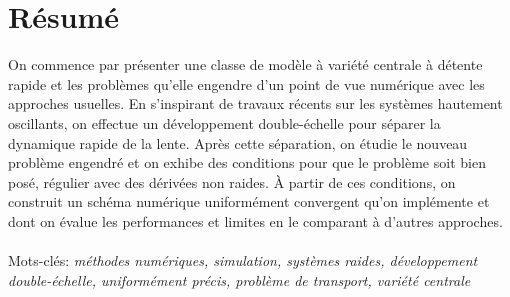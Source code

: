 \documentclass{templatePFE}
\begin{document}
\soustitre{} %

\couverture %


\chapter*{Résumé}
On commence par présenter une classe de modèle à variété centrale à détente rapide et les problèmes qu'elle engendre d'un point de vue numérique avec les approches usuelles. 
En s'inspirant de travaux récents sur les systèmes hautement oscillants, on effectue un développement double-échelle pour séparer la dynamique rapide de la lente. 
Après cette séparation, on étudie le nouveau problème engendré et on exhibe des conditions pour que le problème soit bien posé, régulier avec des dérivées non raides. 
À partir de ces conditions, on construit un schéma numérique uniformément convergent qu'on implémente et dont on évalue les performances et limites en le comparant à d'autres approches. 
\\ 
\\
Mots-clés: {\itshape
méthodes numériques, simulation, systèmes raides, développement double-échelle, uniformément précis, problème de transport, variété centrale
}
\end{document}
